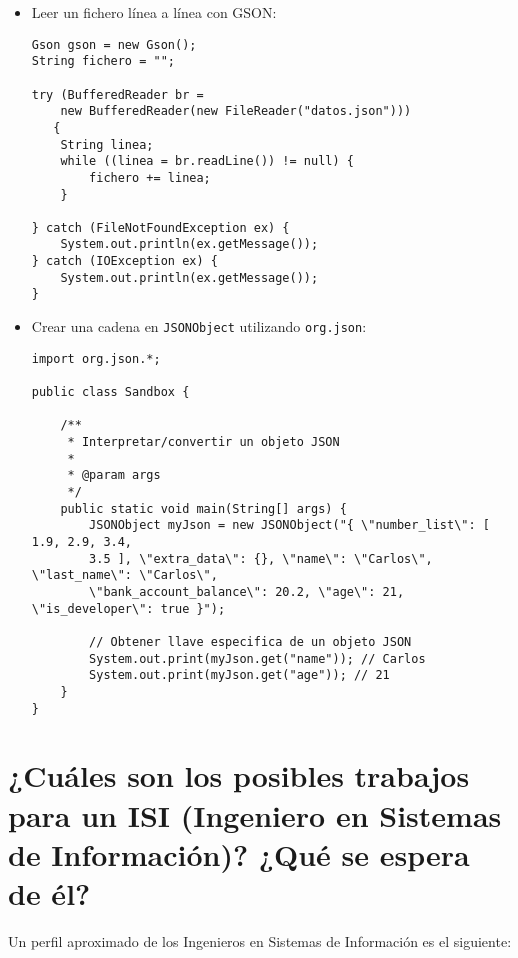 \documentclass[a4paper,11pt]{scrartcl}
\begin{document}
\begin{itemize}
\item Leer un fichero línea a línea con GSON:

\begin{lstlisting}
Gson gson = new Gson();
String fichero = "";
 
try (BufferedReader br = 
    new BufferedReader(new FileReader("datos.json"))) 
   {
    String linea;
    while ((linea = br.readLine()) != null) {
        fichero += linea;
    }
 
} catch (FileNotFoundException ex) {
    System.out.println(ex.getMessage());
} catch (IOException ex) {
    System.out.println(ex.getMessage());
}
\end{lstlisting}

\item Crear una cadena en \texttt{JSONObject} utilizando \texttt{org.json}:

\begin{lstlisting}
import org.json.*;

public class Sandbox {
    
    /**
     * Interpretar/convertir un objeto JSON
     * 
     * @param args 
     */
    public static void main(String[] args) {
        JSONObject myJson = new JSONObject("{ \"number_list\": [ 1.9, 2.9, 3.4, 
        3.5 ], \"extra_data\": {}, \"name\": \"Carlos\", \"last_name\": \"Carlos\", 
        \"bank_account_balance\": 20.2, \"age\": 21, \"is_developer\": true }");
        
        // Obtener llave especifica de un objeto JSON
        System.out.print(myJson.get("name")); // Carlos
        System.out.print(myJson.get("age")); // 21
    }
}
\end{lstlisting}

\end{itemize}

\section{¿Cuáles son los posibles trabajos para un ISI (Ingeniero en Sistemas de Información)? ¿Qué se espera de él?}


Un perfil aproximado de los Ingenieros en Sistemas de Información es el siguiente:
\end{document}
